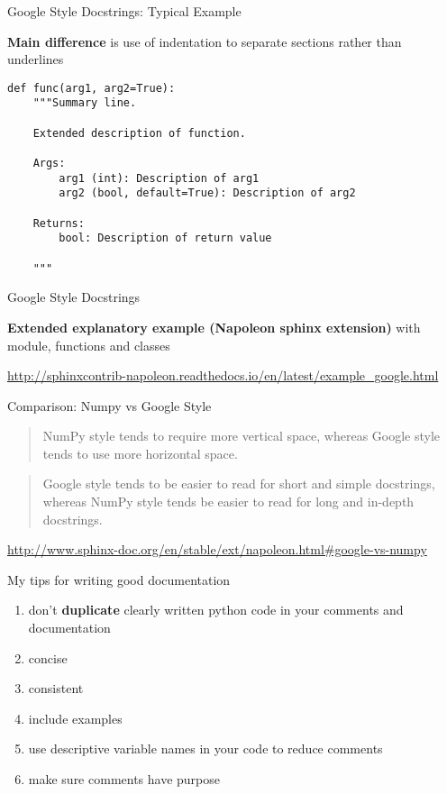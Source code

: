 \documentclass{beamer}
\begin{document}
\begin{frame}[fragile]{Google Style Docstrings: Typical Example}

\textbf{Main difference} is use of indentation to separate sections rather than underlines

\begin{verbatim}
def func(arg1, arg2=True):
    """Summary line.

    Extended description of function.

    Args:
        arg1 (int): Description of arg1
        arg2 (bool, default=True): Description of arg2

    Returns:
        bool: Description of return value

    """
\end{verbatim}
\end{frame}


\begin{frame}{Google Style Docstrings}

\textbf{Extended explanatory example (Napoleon sphinx extension)} with module, functions and classes

\url{http://sphinxcontrib-napoleon.readthedocs.io/en/latest/example_google.html}

\end{frame}


\begin{frame}{Comparison: Numpy vs Google Style}

\begin{quote}
NumPy style tends to require more vertical space, whereas Google style tends to use more horizontal space. 
\end{quote}

\begin{quote}
Google style tends to be easier to read for short and simple docstrings, whereas NumPy style tends be easier to read for long and in-depth docstrings.
\end{quote}

\begin{flushright}
\url{http://www.sphinx-doc.org/en/stable/ext/napoleon.html\#google-vs-numpy}
\end{flushright}

\end{frame}


\begin{frame}{My tips for writing good documentation}

\begin{enumerate}
  \item don't \textbf{duplicate} clearly written python code in your comments and documentation
  \item concise
  \item consistent
  \item include examples
  \item use descriptive variable names in your code to reduce comments
  \item make sure comments have purpose
\end{enumerate}

\end{frame}
\end{document}
